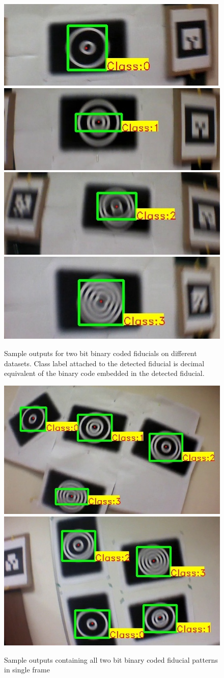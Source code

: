 \documentclass[10pt,twocolumn,letterpaper]{article}
\begin{document}
\begin{figure}[hb!]
\centering
  \includegraphics[width=0.4\linewidth]{output_00.jpg}
  \includegraphics[width=0.4\linewidth]{output_01.jpg}
  \includegraphics[width=0.4\linewidth]{output_10.jpg}
  \includegraphics[width=0.4\linewidth]{output_11.jpg}
  \caption{Sample outputs for two bit binary coded fiducials on different
  datasets. Class label attached to the detected fiducial is decimal equivalent
  of the binary code embedded in the detected fiducial.}
  \label{fig:out_outputs}
\end{figure}


\begin{figure}[ht!]
\centering
  \includegraphics[width=.45\linewidth]{output_all_2.jpg}
  \includegraphics[width=.45\linewidth]{new_results/output_test_all1.jpg}
  \caption{Sample outputs containing all two bit binary coded fiducial patterns
  in single frame}
  \label{fig:output_all}
\end{figure}
\end{document}
